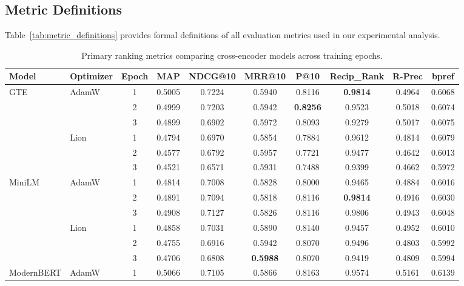 \subsection{Metric Definitions}
\label{app:metric_defs}
Table~\ref{tab:metric_definitions} provides formal definitions of all evaluation metrics used in our experimental analysis.

\begin{table}[t]
\centering
\caption{Primary ranking metrics comparing cross-encoder models across training epochs.}
\label{tab:primary_metrics}
\small
\begin{tabular}{llcccccccc}
\toprule
\textbf{Model} & \textbf{Optimizer} & \textbf{Epoch} & \textbf{MAP} & \textbf{NDCG@10} & \textbf{MRR@10} & \textbf{P@10} & \textbf{Recip\_Rank} & \textbf{R-Prec} & \textbf{bpref} \\
\midrule
\multirow{6}{*}{GTE} & \multirow{3}{*}{AdamW} 
 & 1 & 0.5005 & 0.7224 & 0.5940 & 0.8116 & \textbf{0.9814} & 0.4964 & 0.6068 \\
 & & 2 & 0.4999 & 0.7203 & 0.5942 & \textbf{0.8256} & 0.9523 & 0.5018 & 0.6074 \\
 & & 3 & 0.4899 & 0.6902 & 0.5972 & 0.8093 & 0.9279 & 0.5017 & 0.6075 \\
\cmidrule{2-10}
 & \multirow{3}{*}{Lion} 
 & 1 & 0.4794 & 0.6970 & 0.5854 & 0.7884 & 0.9612 & 0.4814 & 0.6079 \\
 & & 2 & 0.4577 & 0.6792 & 0.5957 & 0.7721 & 0.9477 & 0.4642 & 0.6013 \\
 & & 3 & 0.4521 & 0.6571 & 0.5931 & 0.7488 & 0.9399 & 0.4662 & 0.5972 \\
\midrule
\multirow{6}{*}{MiniLM} & \multirow{3}{*}{AdamW} 
 & 1 & 0.4814 & 0.7008 & 0.5828 & 0.8000 & 0.9465 & 0.4884 & 0.6016 \\
 & & 2 & 0.4891 & 0.7094 & 0.5818 & 0.8116 & \textbf{0.9814} & 0.4916 & 0.6030 \\
 & & 3 & 0.4908 & 0.7127 & 0.5826 & 0.8116 & 0.9806 & 0.4943 & 0.6048 \\
\cmidrule{2-10}
 & \multirow{3}{*}{Lion} 
 & 1 & 0.4858 & 0.7031 & 0.5890 & 0.8140 & 0.9457 & 0.4952 & 0.6010 \\
 & & 2 & 0.4755 & 0.6916 & 0.5942 & 0.8070 & 0.9496 & 0.4803 & 0.5992 \\
 & & 3 & 0.4706 & 0.6808 & \textbf{0.5988} & 0.8070 & 0.9419 & 0.4809 & 0.5994 \\
\midrule
\multirow{6}{*}{ModernBERT} & \multirow{3}{*}{AdamW} 
 & 1 & 0.5066 & 0.7105 & 0.5866 & 0.8163 & 0.9574 & 0.5161 & 0.6139 \\

\end{tabular}
\end{table}
